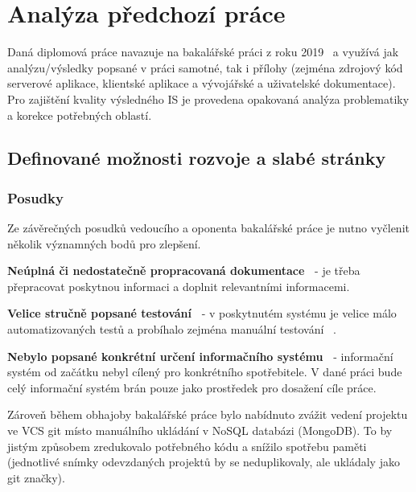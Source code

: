 \chapter{Analýza předchozí práce}\label{ch:analysis}



Daná diplomová práce navazuje na bakalářské práci z roku 2019~\cite{bachelorthesis} a využívá jak analýzu/výsledky popsané v práci samotné, tak i přílohy (zejména zdrojový kód serverové aplikace, klientské aplikace a vývojářské a uživatelské dokumentace).
Pro zajištění kvality výsledného \gls{IS} je provedena opakovaná analýza problematiky a korekce potřebných oblastí.



\section{Definované možnosti rozvoje a slabé stránky}



\subsection{Posudky}
Ze závěrečných posudků vedoucího a oponenta bakalářské práce je nutno vyčlenit několik významných bodů pro zlepšení.

\begin{ul}
   \item
   \textbf{Neúplná či nedostatečně propracovaná dokumentace~\cite{bachelorthesisreportsupervisor}} - je třeba přepracovat poskytnou informaci a doplnit relevantními informacemi.
   \item
   \textbf{Velice stručně popsané testování~\cite{bachelorthesisreportreviewer}} - v poskytnutém systému je velice málo automatizovaných testů a probíhalo zejména manuální testování~\cite{bachelorthesis} .
   \item
   \textbf{Nebylo popsané konkrétní určení informačního systému~\cite{bachelorthesisreportreviewer}} - informační systém od začátku nebyl cílený pro konkrétního spotřebitele.
   V dané práci bude celý informační systém brán pouze jako prostředek pro dosažení cíle práce.
\end{ul}

Zároveň během obhajoby bakalářské práce bylo nabídnuto zvážit vedení projektu ve \gls{VCS} git místo manuálního ukládání v NoSQL databázi (MongoDB).
To by jistým způsobem zredukovalo potřebného kódu a snížilo spotřebu paměti (jednotlivé snímky odevzdaných projektů by se neduplikovaly, ale ukládaly jako git značky).



